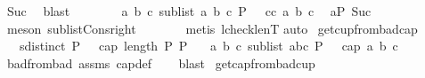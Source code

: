 \begin{isabellebody}
\ Suc{\isacharparenleft}{\kern0pt}{}{\isacharparenright}{\kern0pt}\ \isamarkupfalse%
\ blast\isanewline
\ \ \ \ \ \ \isamarkupfalse%
\ {\isachardoublequoteopen}{\isasymexists}a\ b\ c{\isachardot}{\kern0pt}\ sublist\ {\isacharbrackleft}{\kern0pt}a{\isacharcomma}{\kern0pt}\ b{\isacharcomma}{\kern0pt}\ c{\isacharbrackright}{\kern0pt}\ P\ {\isasymand}\ {\isasymnot}\ cc\ a\ b\ c{\isachardoublequoteclose}\ \isamarkupfalse%
\ aP\ Suc\ \isamarkupfalse%
\ {\isacharparenleft}{\kern0pt}meson\ sublist{\isacharunderscore}{\kern0pt}Cons{\isacharunderscore}{\kern0pt}right{\isacharparenright}{\kern0pt}\isanewline
\ \ \ \ \isamarkupfalse%
\isanewline
\ \ \isamarkupfalse%
{\isacharparenleft}{\kern0pt}metis\ lcheck{\isacharunderscore}{\kern0pt}len{}{\isacharunderscore}{\kern0pt}T{\isacharparenright}{\kern0pt}\isanewline
{}\isamarkupfalse%
{\isacharparenleft}{\kern0pt}auto{\isacharparenright}{\kern0pt}%
\endisatagproof
{\isafoldproof}%
%
\isadelimproof
\isanewline
%
\endisadelimproof
\isanewline
{}\isamarkupfalse%
\ get{\isacharunderscore}{\kern0pt}cup{\isacharunderscore}{\kern0pt}from{\isacharunderscore}{\kern0pt}bad{\isacharunderscore}{\kern0pt}cap{\isacharcolon}{\kern0pt}\isanewline
\ \ \ {\isachardoublequoteopen}sdistinct\ P{\isachardoublequoteclose}\ \ {\isachardoublequoteopen}{\isasymnot}\ cap\ {\isacharparenleft}{\kern0pt}length\ P{\isacharparenright}{\kern0pt}\ P{\isachardoublequoteclose}\isanewline
\ \ \ {\isachardoublequoteopen}{\isasymexists}a\ b\ c{\isachardot}{\kern0pt}\ {\isacharparenleft}{\kern0pt}sublist\ {\isacharbrackleft}{\kern0pt}a{\isacharcomma}{\kern0pt}b{\isacharcomma}{\kern0pt}c{\isacharbrackright}{\kern0pt}\ P{\isacharparenright}{\kern0pt}\ {\isasymand}\ {\isasymnot}\ cap{}\ a\ b\ c{\isachardoublequoteclose}\isanewline
%
\isadelimproof
\ \ %
\endisadelimproof
%
\isatagproof
{}\isamarkupfalse%
\ bad{}{\isacharunderscore}{\kern0pt}from{\isacharunderscore}{\kern0pt}bad\ assms{\isacharparenleft}{\kern0pt}{}{\isacharcomma}{\kern0pt}{}{\isacharparenright}{\kern0pt}\ cap{\isacharunderscore}{\kern0pt}def\isanewline
\ \ \isamarkupfalse%
\ blast%
\endisatagproof
{\isafoldproof}%
%
\isadelimproof
\isanewline
%
\endisadelimproof
\isanewline
{}\isamarkupfalse%
\ get{\isacharunderscore}{\kern0pt}cap{\isacharunderscore}{\kern0pt}from{\isacharunderscore}{\kern0pt}bad{\isacharunderscore}{\kern0pt}cup{\isacharcolon}{\kern0pt}\isanewline

\end{isabellebody}
